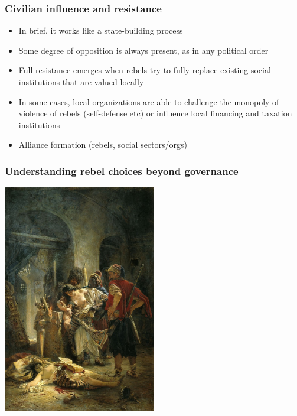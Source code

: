 \documentclass[utf8, xcolor=dvipsnames]{beamer}
\begin{document}

\begin{frame}
\frametitle{Civilian influence and resistance}
\centering

\begin{itemize}
  \item<1-> In brief, it works like a state-building process
  \item<2-> Some degree of opposition is always present, as in any political order
  \item<3-> Full resistance emerges when rebels try to fully replace existing social institutions that are valued locally
  \item<4-> In some cases, local organizations are able to challenge the monopoly of violence of rebels (self-defense etc) or influence local financing and taxation institutions
  \item<5-> Alliance formation (rebels, social sectors/orgs)
\end{itemize}

\end{frame}

\begin{frame}
\frametitle{Understanding rebel choices beyond governance}
\centering

\includegraphics[width = 0.5\textwidth]{img/The_Bulgarian_martyresses}

\end{frame}
\end{document}
